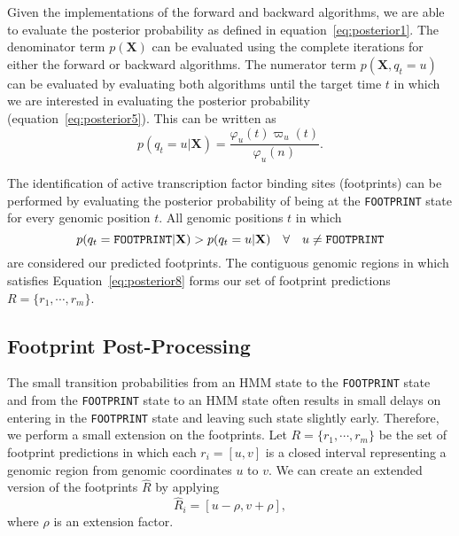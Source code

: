 Given the implementations of the forward and backward algorithms, we are able to evaluate the posterior probability as defined in equation~\ref{eq:posterior1}. The denominator term $ p(\mathbf{X}) $ can be evaluated using the complete iterations for either the forward or backward algorithms. The numerator term $ p(\mathbf{X}, q_t = u) $ can be evaluated by evaluating both algorithms until the target time $ t $ in which we are interested in evaluating the posterior probability (equation~\ref{eq:posterior5}). This can be written as
\begin{equation}
  \label{eq:posterior7}
  p(q_t = u | \mathbf{X}) = \frac{\varphi_u(t) \varpi_u(t)}{\varphi_u(n)}.
\end{equation}

The identification of active transcription factor binding sites (footprints) can be performed by evaluating the posterior probability of being at the {\tt FOOTPRINT} state for every genomic position $ t $. All genomic positions $ t $ in which
\begin{equation}
  \label{eq:posterior8}
  p(q_t = \text{{\tt FOOTPRINT}} | \mathbf{X}) > p(q_t = u | \mathbf{X}) \quad \forall \quad u \neq \text{{\tt FOOTPRINT}}
\end{equation}
are considered our predicted footprints. The contiguous genomic regions in which satisfies Equation~\ref{eq:posterior8} forms our set of footprint predictions $R = \{ {r}_{1}, \cdots, {r}_{m} \}$.

\subsection{Footprint Post-Processing}
\label{sec:footprint.postprocessing}

The small transition probabilities from an HMM state to the {\tt FOOTPRINT} state and from the {\tt FOOTPRINT} state to an HMM state often results in small delays on entering in the {\tt FOOTPRINT} state and leaving such state slightly early. Therefore, we perform a small extension on the footprints. Let $R = \{ {r}_{1}, \cdots, {r}_{m} \}$ be the set of footprint predictions in which each $r_i = [u,v]$ is a closed interval representing a genomic region from genomic coordinates $u$ to $v$. We can create an extended version of the footprints $\hat{R}$ by applying
\begin{equation}
  \label{eq:post.process.1}
  \hat{R}_i = [u-\rho, v+\rho],
\end{equation}
where $\rho$ is an extension factor.

